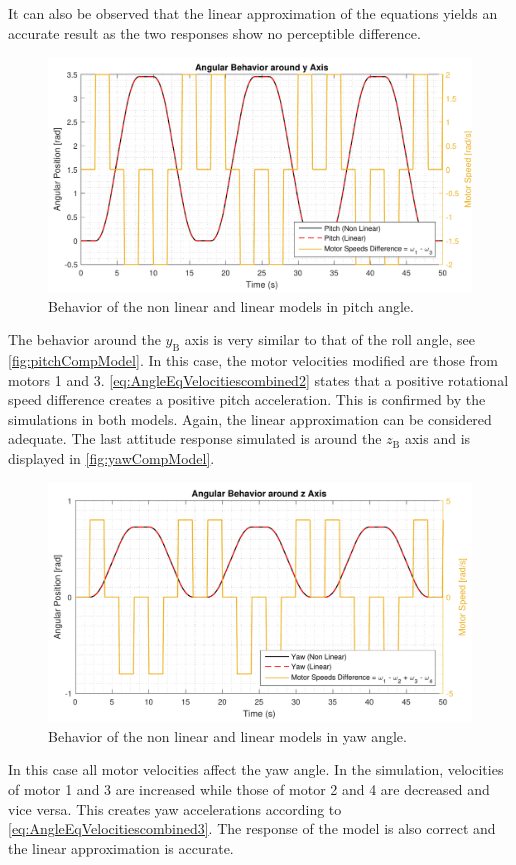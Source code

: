 It can also be observed that the linear approximation of the equations yields an accurate result as the two responses show no perceptible difference.
\vspace{-0.4 cm}
\begin{figure}[H]
	\centering
	\includegraphics[scale=0.62]{figures/pitchCompModel}
	\caption{Behavior of the non linear and linear models in pitch angle.}
	\label{fig:pitchCompModel}
\end{figure} 
\vspace{-0.8 cm}
The behavior around the $y_{\mathrm{B}}$ axis is very similar to that of the roll angle, see \autoref{fig:pitchCompModel}. In this case, the motor velocities modified are those from motors 1 and 3. 
%
\autoref{eq:AngleEqVelocitiescombined2} states that a positive rotational speed difference creates a positive pitch acceleration. This is confirmed by the simulations in both models. Again, the linear approximation can be considered adequate.
The last attitude response simulated is around the $z_{\mathrm{B}}$ axis and is displayed in \autoref{fig:yawCompModel}. 
\vspace{-0.4 cm}
\begin{figure}[H]
	\centering
	\includegraphics[scale=0.62]{figures/yawCompModel}
	\caption{Behavior of the non linear and linear models in yaw angle.}
	\label{fig:yawCompModel}
\end{figure} 
\vspace{-0.8 cm}
In this case all motor velocities affect the yaw angle. In the simulation, velocities of motor 1 and 3 are increased while those of motor 2 and 4 are decreased and vice versa. This creates yaw accelerations according to \autoref{eq:AngleEqVelocitiescombined3}. 
The response of the model is also correct and the linear approximation is accurate.

